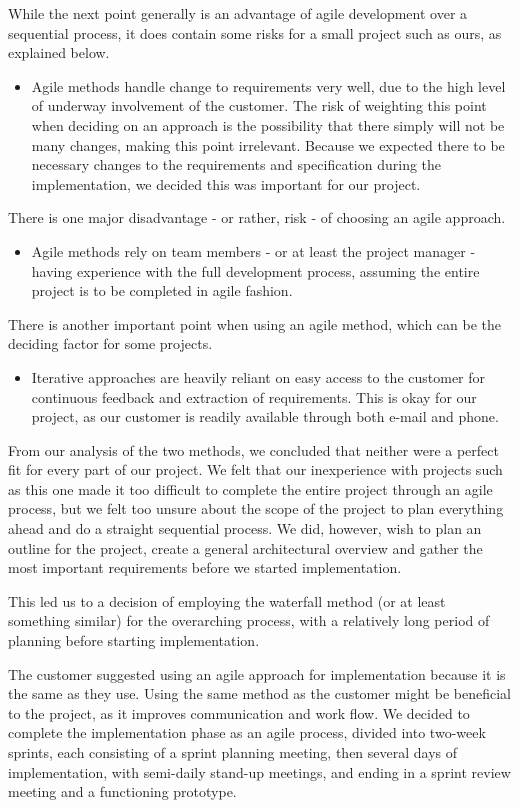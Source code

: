 While the next point generally is an advantage of agile development over a sequential process, it does contain some risks for a small project such as ours, as explained below.
	\begin{itemize}
		\item Agile methods handle change to requirements very well, due to the high level of underway involvement of the customer. The risk of weighting this point when deciding on an approach is the possibility that there simply will not be many changes, making this point irrelevant. Because we expected there to be necessary changes to the requirements and specification during the implementation, we decided this was important for our project.
	\end{itemize}
There is one major disadvantage - or rather, risk - of choosing an agile approach.
	\begin{itemize}
		\item Agile methods rely on team members - or at least the project manager - having experience with the full development process, assuming the entire project is to be completed in agile fashion.		
	\end{itemize}
There is another important point when using an agile method, which can be the deciding factor for some projects.
	\begin{itemize}
		\item Iterative approaches are heavily reliant on easy access to the customer for continuous feedback and extraction of requirements. This is okay for our project, as our customer is readily available through both e-mail and phone.
	\end{itemize}

From our analysis of the two methods, we concluded that neither were a perfect fit for every part of our project. We felt that our inexperience with projects such as this one made it too difficult to complete the entire project through an agile process, but we felt too unsure about the scope of the project to plan everything ahead and do a straight sequential process. We did, however, wish to plan an outline for the project, create a general architectural overview and gather the most important requirements before we started implementation.

This led us to a decision of employing the waterfall method (or at least something similar) for the overarching process, with a relatively long period of planning before starting implementation.

The customer suggested using an agile approach for implementation because it is the same as they use. Using the same method as the customer might be beneficial to the project, as it improves communication and work flow. We decided to complete the implementation phase as an agile process, divided into two-week sprints, each consisting of a sprint planning meeting, then several days of implementation, with semi-daily stand-up meetings, and ending in a sprint review meeting and a functioning prototype.

